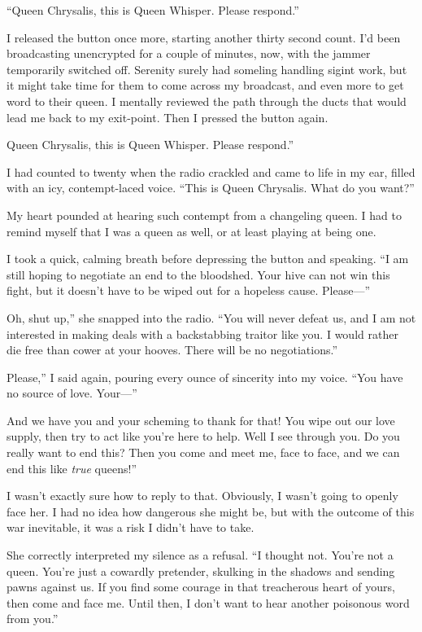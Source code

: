“Queen Chrysalis, this is Queen Whisper. Please respond.”

I released the button once more, starting another thirty second count. I’d been broadcasting unencrypted for a couple of minutes, now, with the jammer temporarily switched off. Serenity surely had someling handling sigint work, but it might take time for them to come across my broadcast, and even more to get word to their queen. I mentally reviewed the path through the ducts that would lead me back to my exit-point. Then I pressed the button again.

\leavevmode{}Queen Chrysalis, this is Queen Whisper. Please respond.”

I had counted to twenty when the radio crackled and came to life in my ear, filled with an icy, contempt-laced voice. “This is Queen Chrysalis. What do you want?”

My heart pounded at hearing such contempt from a changeling queen. I had to remind myself that I was a queen as well, or at least playing at being one.

I took a quick, calming breath before depressing the button and speaking. “I am still hoping to negotiate an end to the bloodshed. Your hive can not win this fight, but it doesn’t have to be wiped out for a hopeless cause. Please—”

\leavevmode{}Oh, shut up,” she snapped into the radio. “You will never defeat us, and I am not interested in making deals with a backstabbing traitor like you. I would rather die free than cower at your hooves. There will be no negotiations.”

\leavevmode{}Please,” I said again, pouring every ounce of sincerity into my voice. “You have no source of love. Your—”

\leavevmode{}And we have you and your scheming to thank for that! You wipe out our love supply, then try to act like you’re here to help. Well I see through you. Do you really want to end this? Then you come and meet me, face to face, and we can end this like \textit{true} queens!”

I wasn’t exactly sure how to reply to that. Obviously, I wasn’t going to openly face her. I had no idea how dangerous she might be, but with the outcome of this war inevitable, it was a risk I didn’t have to take.

She correctly interpreted my silence as a refusal. “I thought not. You’re not a queen. You’re just a cowardly pretender, skulking in the shadows and sending pawns against us. If you find some courage in that treacherous heart of yours, then come and face me. Until then, I don’t want to hear another poisonous word from you.”

